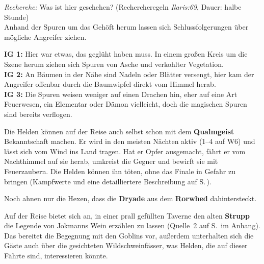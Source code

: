 {\emph{Recherche:} Was ist hier geschehen? (Rechercheregeln \emph{Ilaris:69}, Dauer: halbe Stunde)\\
Anhand der Spuren um das Gehöft herum lassen sich Schlussfolgerungen über mögliche Angreifer ziehen.

\textbf{IG 1:} Hier war etwas, das geglüht haben muss. In einem großen Kreis um die Szene herum ziehen sich Spuren von Asche und verkohlter Vegetation.\\
\textbf{IG 2:} An Bäumen in der Nähe sind Nadeln oder Blätter versengt, hier kam der Angreifer offenbar durch die Baumwipfel direkt vom Himmel herab.\\
\textbf{IG 3:} Die Spuren weisen weniger auf einen Drachen hin, eher auf eine Art Feuerwesen, ein Elementar oder Dämon vielleicht, doch die magischen Spuren sind bereits verflogen.
}

Die Helden können auf der Reise auch selbst schon mit dem \textbf{Qualmgeist} Bekanntschaft machen.
Er wird in den meisten Nächten aktiv (1--4 auf W6) und lässt sich vom Wind ins Land tragen.
Hat er Opfer ausgemacht, fährt er vom Nachthimmel auf sie herab, umkreist die Gegner und bewirft sie mit Feuerzaubern.
Die Helden können ihn töten, ohne das Finale in Gefahr zu bringen (Kampfwerte und eine detailliertere Beschreibung auf S.\,\pageref{geist}).

Noch ahnen nur die Hexen, dass die \textbf{Dryade} aus dem \textbf{Rorwhed} dahintersteckt.


\newpage

Auf der Reise bietet sich an, in einer prall gefüllten Taverne den alten \textbf{Strupp} die Legende von Jokmanns Wein erzählen zu lassen (Quelle~2 auf S.\,\pageref{aiw_quelle2} im Anhang).
Das bereitet die Begegnung mit den Goblins vor, außerdem unterhalten sich die Gäste auch über die gesichteten Wildschweinfässer, was Helden, die auf dieser Fährte sind, interessieren könnte.

